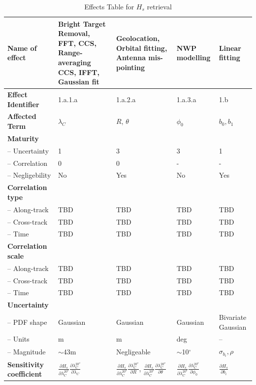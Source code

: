 \begin{table}[h]
		\centering
		\scriptsize %
		\setlength{\tabcolsep}{2pt} %
		\caption{Effects Table for $H_s$ retrieval}
		
		\begin{tabularx}{\textwidth}{l | X | X | X | X}
			\toprule
			\textbf{Name of effect} & Bright Target Removal, FFT, CCS, Range-averaging CCS, IFFT, Gaussian fit & Geolocation, Orbital fitting, Antenna mis-pointing & NWP modelling & Linear fitting \\
			\midrule
			\textbf{Effect Identifier} & 1.a.1.a & 1.a.2.a & 1.a.3.a & 1.b \\
			\midrule
			\textbf{Affected Term} & $\lambda_C$ & $R$, $\theta$ & $\phi_{0}$ & $b_0, b_1$ \\
			\midrule
			\textbf{Maturity} &  &  &  &  \\
			\quad -- Uncertainty & 1 & 3 & 3 & 1 \\
			\quad -- Correlation & 0 & 0 & - & - \\
			\quad -- Negligebility & No & Yes & No & Yes \\
			\midrule
			\textbf{Correlation type} &  &  &  &  \\
			\quad -- Along-track & TBD & TBD & TBD & TBD \\
			\quad -- Cross-track & TBD & TBD & TBD & TBD \\
			\quad -- Time & TBD & TBD & TBD & TBD \\
			\midrule
			\textbf{Correlation scale} &  &  &  &  \\
			\quad -- Along-track & TBD & TBD & TBD & TBD \\
			\quad -- Cross-track & TBD & TBD & TBD & TBD \\
			\quad -- Time & TBD & TBD & TBD & TBD \\
			\midrule
			\textbf{Uncertainty} & & & & \\
			\quad -- PDF shape & Gaussian & Gaussian & Gaussian & Bivariate \newline Gaussian \\
			\quad -- Units & m & m & deg & -- \\
			\quad -- Magnitude & $\sim$43m & Negligeable & $\sim$10$^\circ$ & $\sigma_{b_i}, \rho$ \\
			\midrule
			\textbf{Sensitivity coefficient} & $\frac{\partial H_s}{\partial \lambda_C^{20^{o}}} \frac{\partial \lambda_C^{20^{o}}}{\partial \lambda_C}$ & $\frac{\partial H_s}{\partial \lambda_C^{20^{o}}} \frac{\partial \lambda_C^{20^{o}}}{\partial R}$, $\frac{\partial H_s}{\partial \lambda_C^{20^{o}}} \frac{\partial \lambda_C^{20^{o}}}{\partial \theta}$ & $\frac{\partial H_s}{\partial \lambda_C^{20^{o}}} \frac{\partial \lambda_C^{20^{o}}}{\partial \phi_0}$ & $\frac{\partial H_s}{\partial b_i}$ \\
			\bottomrule
		\end{tabularx}
        \label{tab: effects Hs}
	\end{table}


